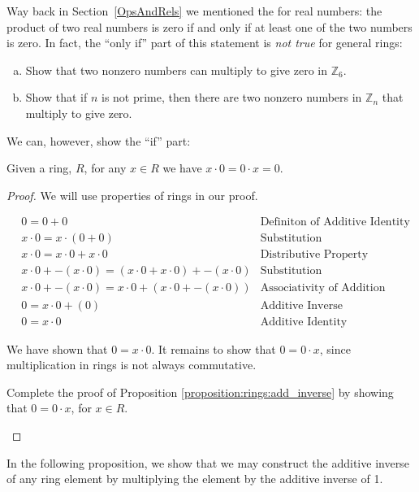 Way back in Section~\ref{OpsAndRels} we mentioned the  for real numbers: the product of two real numbers is zero if and only if at least one of the two numbers is zero. In fact, the ``only if'' part of this statement is \emph{not true} for general rings:

\begin{exercise}\label{exercise:rings:ModZeroProducts}
\begin{enumerate}[(a)]
\item Show that two nonzero numbers can multiply to give zero in ${\mathbb Z}_6$.
\item Show that if $n$ is not prime, then there are two nonzero numbers in ${\mathbb Z}_n$ that multiply to give zero.
\end{enumerate}
\end{exercise}
We can, however, show the ``if'' part:

\begin{prop}\label{proposition:rings:add_inverse}
Given a ring, $R$, for any $x\in R$ we have $x\cdot0=0\cdot x=0$.

\begin{proof}
We will use properties of rings in our proof.

\begin{align*}
&0=0+0 & \text{Definiton of Additive Identity}\\
&x\cdot0=x\cdot(0+0) & \text{Substitution}\\
&x\cdot0=x\cdot0+x\cdot0 & \text{Distributive Property}\\
&x\cdot0+-(x\cdot0)=(x\cdot0+x\cdot0)+-(x\cdot0) & \text{Substitution}\\
&x\cdot0+-(x\cdot0)=x\cdot0+(x\cdot0+-(x\cdot0)) & \text{Associativity of Addition}\\
&0=x\cdot0+(0) & \text{Additive Inverse}\\
&0=x\cdot0 & \text{Additive Identity}
\end{align*}

We have shown that $0=x\cdot0$. It remains to show that $0=0\cdot x$, since multiplication in rings is not always commutative.

\begin{exercise}\label{exercise:rings:MultZeroRing}
Complete the proof of Proposition \ref{proposition:rings:add_inverse} by showing that $0=0\cdot x$, for $x\in R$.
\end{exercise}
\end{proof}
\end{prop}
In the following proposition, we show that we may construct the additive inverse of any ring element by multiplying the element by the additive inverse of 1.

